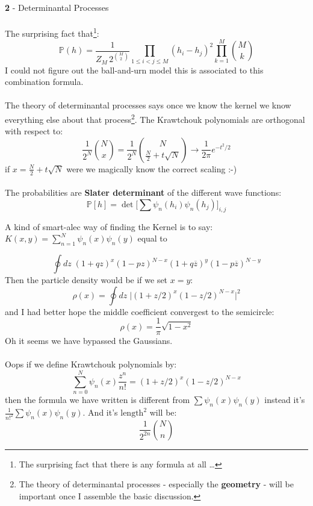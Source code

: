 \documentclass[12pt]{article}
\begin{document}
\noindent \textbf{2} - Determinantal Processes \\ \\
The surprising fact that\footnote{The surprising fact that there is any formula at all \dots}:
$$ \mathbb{P}(h)
= \frac{1}{Z_M \, 2^{\binom{M}{2}}} \prod_{1 \leq i < j \leq M}
(h_i - h_j)^2 \prod_{k=1}^M
\binom{M}{k}
 $$
I could not figure out the ball-and-urn model this is associated to this combination formula. \\ \\
The theory of determinantal processes says once we know the kernel we know everything else about that process\footnote{The theory of determinantal processes - especially the \textbf{geometry} - will be important once I assemble the basic discussion.}.  The Krawtchouk polynomials are orthogonal with respect to:
$$ \frac{1}{2^N} \binom{N}{x} =
  \frac{1}{2^N} \binom{N}{\frac{N}{2} + t \sqrt{N}} \to \frac{1}{2\pi } e^{-t^2 / 2}$$
if $ x = \frac{N}{2} + t \sqrt{N}$ were we magically know the correct scaling :-) \\ \\
The probabilities are \textbf{Slater determinant} of the different wave functions:
$$ \mathbb{P}[h] = \det \Big[ \sum \psi_n(h_i)\psi_n(h_j) \Big]_{i,j}$$

\newpage

\noindent A kind of smart-alec way of finding the Kernel is to say: $K(x,y) = \sum_{n=1}^N \psi_n(x)\psi_n(y)$ equal to

$$ 
\oint dz \; (1+qz)^x(1-pz)^{N-x}
(1+q\overline{z})^y(1-p\overline{z})^{N-y}
$$
Then the particle density would be if we set $x = y$:
$$ \rho(x) =
\oint dz \; \Big|(1+z/2)^x(1-z/2)^{N-x}\Big|^2
 $$
 and I had better hope the middle coefficient convergest to the semicircle:
 $$ \rho(x) = \frac{1}{\pi}\sqrt{1-x^2}$$
Oh it seems we have bypassed the Gaussians.  \\ \\
Oops if we define Krawtchouk polynomials by:
$$ \sum_{n=0}^N \psi_n(x) \frac{z^n}{n!} = (1+z/2)^x (1-z/2)^{N-x} $$
then the formula we have written is different from 
$\sum \psi_n(x) \psi_n(y)$ instead it's $\frac{1}{n!^2}\sum \psi_n(x) \psi_n(y)$.  And it's $\text{length}^\text{2}$ will be:
$$ \frac{1}{2^{2n}}\binom{N}{n} $$
\newpage
\end{document}
